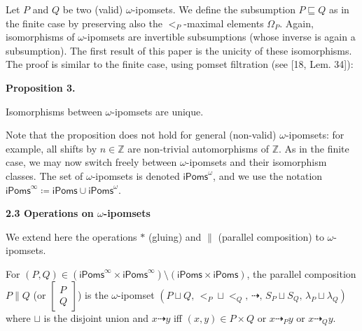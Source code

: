  
 
Let $P$ and $Q$ be two (valid) $\omega$-ipomsets. We define the subsumption $P\sqsubseteq Q$ as in the finite case by preserving also the $<_{P}$-maximal elements $\Omega_{P}$. Again, isomorphisms of $\omega$-ipomsets are invertible subsumptions (whose inverse is again a subsumption). The first result of this paper is the unicity of these isomorphisms. The proof is similar to the finite case, using pomset filtration (see [18, Lem. 34]):\par
 
 
 
\par\medskip\noindent\textbf{Proposition 3.}\par
 
 
Isomorphisms between $\omega$-ipomsets are unique.\par
 
 
 
 
Note that the proposition does not hold for general (non-valid) $\omega$-ipomsets: for example, all shifts by $n\in\mathbb{Z}$ are non-trivial automorphisms of $\mathbb{Z}$. As in the finite case, we may now switch freely between $\omega$-ipomsets and their isomorphism classes. The set of $\omega$-ipomsets is denoted ${\mathsf{iPoms}^{\omega}}$, and we use the notation ${\mathsf{iPoms}^{\infty}}\coloneqq\mathsf{iPoms}\cup{\mathsf{iPoms}^{\omega}}$.\par
 
 
 
 
\par\medskip\noindent\textbf{2.3 Operations on $\omega$-ipomsets}\par
 
 
We extend here the operations $*$ (gluing) and $\parallel$ (parallel composition) to $\omega$-ipomsets.\par
 
 
 
For $(P,Q)\in({\mathsf{iPoms}^{\infty}}\times{\mathsf{iPoms}^{\infty}})\setminus(\mathsf{iPoms}\times\mathsf{iPoms})$, the parallel composition $P\parallel Q$ (or $\left[\begin{smallmatrix}P\\
Q\end{smallmatrix}\right]$) is the $\omega$-ipomset $(P\sqcup Q,\,<_{P}\sqcup<_{Q},\,\dashrightarrow,\,S_{P}\sqcup S_{Q},\,\lambda_{P}\sqcup\lambda_{Q})$ where $\sqcup$ is the disjoint union and $x\dashrightarrow y$ iff $(x,y)\in P\times Q$ or $x\dashrightarrow_{P}y$ or $x\dashrightarrow_{Q}y$.\par
 
